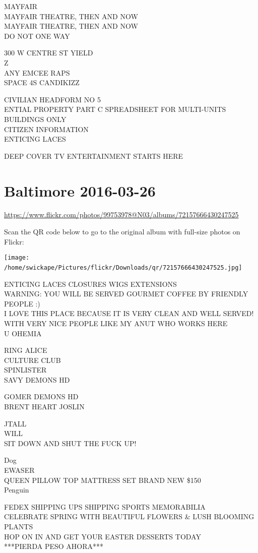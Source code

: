\documentclass[10pt,letterpaper]{article}
\begin{document}
MAYFAIR\\
MAYFAIR THEATRE, THEN AND NOW\\
MAYFAIR THEATRE, THEN AND NOW\\
DO NOT ONE WAY

300 W CENTRE ST YIELD\\
Z\\
ANY EMCEE RAPS\\
SPACE 4S CANDIKIZZ

CIVILIAN HEADFORM NO 5\\
ENTIAL PROPERTY PART C SPREADSHEET FOR MULTI{-}UNITS BUILDINGS ONLY\\
CITIZEN INFORMATION\\
ENTICING LACES

DEEP COVER TV ENTERTAINMENT STARTS HERE
\

\section*{Baltimore 2016-03-26}

\url{https://www.flickr.com/photos/99753978@N03/albums/72157666430247525}

Scan the QR code below to go to the original album with full-size photos on Flickr:

\texttt{[image: /home/swickape/Pictures/flickr/Downloads/qr/72157666430247525.jpg]}
\

ENTICING LACES CLOSURES WIGS EXTENSIONS\\
WARNING: YOU WILL BE SERVED GOURMET COFFEE BY FRIENDLY PEOPLE :)\\
I LOVE THIS PLACE BECAUSE IT IS VERY CLEAN AND WELL SERVED!  WITH VERY NICE PEOPLE LIKE MY ANUT WHO WORKS HERE\\
U OHEMIA

RING ALICE\\
CULTURE CLUB\\
SPINLISTER\\
SAVY DEMONS HD

GOMER DEMONS HD\\
BRENT HEART JOSLIN

JTALL\\
WILL\\
SIT DOWN AND SHUT THE FUCK UP!

Dog\\
EWASER\\
QUEEN PILLOW TOP MATTRESS SET BRAND NEW \$150\\
Penguin

FEDEX SHIPPING UPS SHIPPING SPORTS MEMORABILIA\\
CELEBRATE SPRING WITH BEAUTIFUL FLOWERS \& LUSH BLOOMING PLANTS\\
HOP ON IN AND GET YOUR EASTER DESSERTS TODAY\\
***PIERDA PESO AHORA***
\
\end{document}
